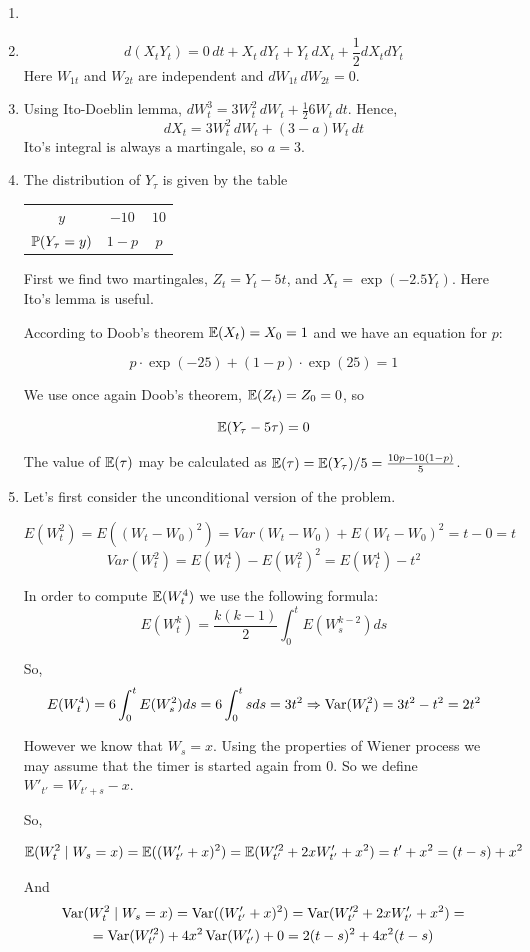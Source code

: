 \documentclass[12pt, a4paper]{article}
\begin{document}
\begin{enumerate}
\item
\item
\[
d(X_t Y_t)=0\, dt + X_t \, dY_t +Y_t \, dX_t + \frac{1}{2} dX_t dY_t
\]
Here $W_{1t}$ and $W_{2t}$ are independent and $dW_{1t} \, dW_{2t}=0$.


\item Using Ito-Doeblin lemma, $dW_t^3=3W_t^2 \, dW_t + \frac{1}{2}6W_t \, dt$. Hence,
\[
dX_t=3W_t^2 \, dW_t + (3-a)W_t \, dt
\]
Ito's integral is always a martingale, so $a=3$.

\item The distribution of $Y_{\tau}$ is given by the table

\begin{tabular}{ccc}
$y$ & $-10$ & $10$ \\
$\P(Y_{\tau}=y)$ & $1-p$ & $p$ \\
\end{tabular}

First we find two martingales, $Z_t=Y_t-5t$, and $X_t=\exp(-2.5 Y_t)$. Here Ito's lemma is useful.

According to Doob's theorem $\E(X_t)=X_0=1$ and we have an equation for $p$:

\[
p\cdot \exp(-25) + (1-p) \cdot \exp(25) = 1
\]


We use once again Doob's theorem, $\E(Z_t)=Z_0=0$, so

\[
\E(Y_{\tau}-5\tau)=0
\]

The value of $\E(\tau)$ may be calculated as $\E(\tau)=\E(Y_{\tau})/5=\frac{10p-10(1-p)}{5}$.

\item Let's first consider the unconditional version of the problem.

\[
E(W^{2}_t)=E((W_t-W_0)^{2})=Var(W_t-W_0)+E(W_t-W_0)^{2}=t-0=t
\]
\[
Var(W^{2}_t)=E(W^{4}_t)-E(W^{2}_t)^{2}=E(W^{4}_t)-t^2
\]

In order to compute $\E(W^{4}_t)$ we use the following formula:
\[
E(W^{k}_t)=\frac{k(k-1)}{2}\int_0^{t}E(W^{k-2}_s)ds
\]

So,
\[
E(W^{4}_t)=6\int_0^{t}E(W^{2}_s)ds=6\int_0^{t}sds=3t^2 \Rightarrow \Var(W^{2}_t)=3t^2-t^2=2t^2
\]

However we know that $W_s=x$. Using the properties of Wiener process we may assume that the timer is started again from $0$. So we define $W'_{t'}=W_{t'+s}-x$.

So,

\[
\E(W_t^2 \mid W_s=x) = \E( (W'_{t'}+x)^2 )= \E(W^{\prime 2}_{t'}+2xW'_{t'}+x^2)=t'+x^2=(t-s)+x^2
\]

And
\begin{multline}
\Var(W^{2}_t \mid W_s=x)=\Var((W'_{t'}+x)^2)=\Var(W^{\prime 2}_{t'} +2xW'_{t'}+x^2)= \\
= \Var(W^{\prime 2}_{t'}) +4x^2 \Var(W'_{t'}) + 0 = 2(t-s)^2+4x^2(t-s)
\end{multline}

\end{enumerate}
\end{document}
